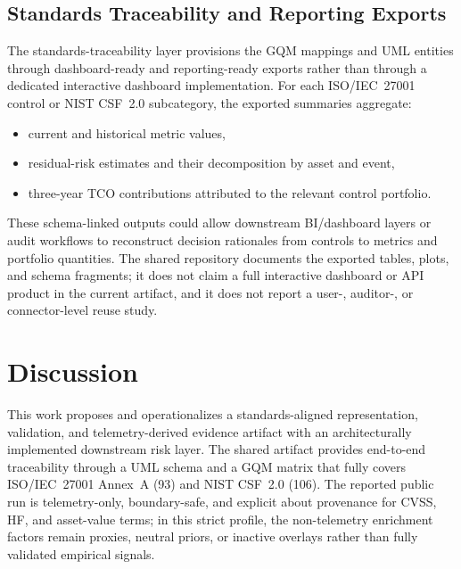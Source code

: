 \documentclass[preprint,12pt]{elsarticle}
\begin{document}
\subsection{Standards Traceability and Reporting Exports}
\label{sec:std-trace}

The standards-traceability layer provisions the GQM mappings and UML entities through dashboard-ready and reporting-ready exports rather than through a dedicated interactive dashboard implementation. For each ISO/IEC~27001 control or NIST CSF~2.0 subcategory, the exported summaries aggregate:
\begin{itemize}[leftmargin=*]
  \item current and historical metric values,
  \item residual-risk estimates and their decomposition by asset and event,
  \item three-year TCO contributions attributed to the relevant control portfolio.
\end{itemize}
These schema-linked outputs could allow downstream BI/dashboard layers or audit workflows to reconstruct decision rationales from controls to metrics and portfolio quantities. The shared repository documents the exported tables, plots, and schema fragments; it does not claim a full interactive dashboard or API product in the current artifact, and it does not report a user-, auditor-, or connector-level reuse study.


\section{Discussion}
\label{sec:discussion}
This work proposes and operationalizes a standards-aligned representation, validation, and telemetry-derived evidence artifact with an architecturally implemented downstream risk layer. The shared artifact provides end-to-end traceability through a UML schema and a GQM matrix that fully covers ISO/IEC~27001 Annex~A (93) and NIST CSF~2.0 (106). The reported public run is telemetry-only, boundary-safe, and explicit about provenance for CVSS, HF, and asset-value terms; in this strict profile, the non-telemetry enrichment factors remain proxies, neutral priors, or inactive overlays rather than fully validated empirical signals.
\end{document}
